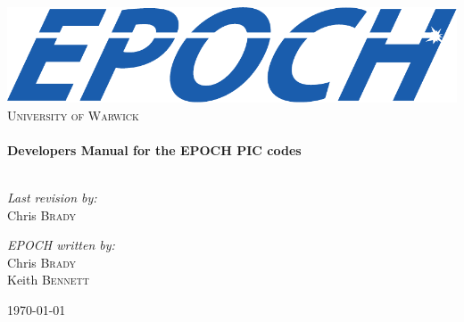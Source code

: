 \begin{titlepage}

\begin{center}

\includegraphics[width=14cm]{./images/EPOCHLogo}\\[1cm]

\textsc{\LARGE University of Warwick}\\[1.5cm]

\HRule \\[0.4cm]
{ \huge \bfseries Developers Manual for the EPOCH PIC codes}\\[0.4cm]

\HRule \\[1.5cm]

\begin{minipage}{0.4\textwidth}
\begin{flushleft} \large
\emph{Last revision by:}\\
Chris \textsc{Brady}
\end{flushleft}
\end{minipage}
\begin{minipage}{0.4\textwidth}
\begin{flushright} \large
\emph{EPOCH written by:} \\
Chris \textsc{Brady}\\
Keith \textsc{Bennett}\\
\end{flushright}
\end{minipage}

\vfill

{\large \today}

\end{center}

\end{titlepage}
